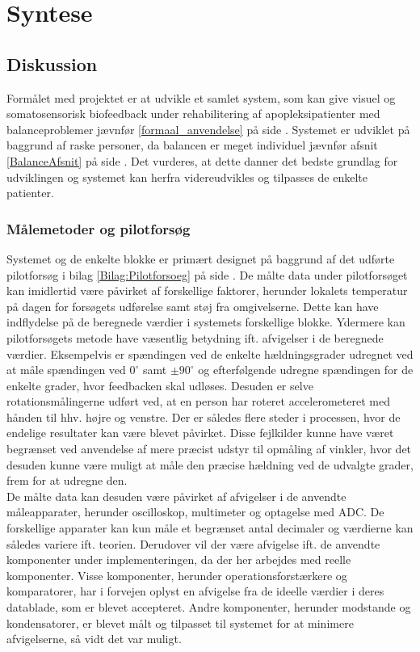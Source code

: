 \chapter{Syntese}
\section{Diskussion}
Formålet med projektet er at udvikle et samlet system, som kan give visuel og somatosensorisk biofeedback under rehabilitering af apopleksipatienter med balanceproblemer jævnfør \ref{formaal_anvendelse} på side \pageref{formaal_anvendelse}. Systemet er udviklet på baggrund af raske personer, da balancen er meget individuel jævnfør afsnit \ref{BalanceAfsnit} på side \pageref{BalanceAfsnit}. Det vurderes, at dette danner det bedste grundlag for udviklingen og systemet kan herfra videreudvikles og tilpasses de enkelte patienter. 

\subsection{Målemetoder og pilotforsøg}
Systemet og de enkelte blokke er primært designet på baggrund af det udførte pilotforsøg i bilag \ref{Bilag:Pilotforsoeg} på side \pageref{Bilag:Pilotforsoeg}. De målte data under pilotforsøget kan imidlertid være påvirket af forskellige faktorer, herunder lokalets temperatur på dagen for forsøgets udførelse samt støj fra omgivelserne. Dette kan have indflydelse på de beregnede værdier i systemets forskellige blokke.
Ydermere kan pilotforsøgets metode have væsentlig betydning ift. afvigelser i de beregnede værdier. Eksempelvis er spændingen ved de enkelte hældningsgrader udregnet ved at måle spændingen ved $0^{\circ}$ samt $\pm90^{\circ}$ og efterfølgende udregne spændingen for de enkelte grader, hvor feedbacken skal udløses. Desuden er selve rotationsmålingerne udført ved, at en person har roteret accelerometeret med hånden til hhv. højre og venstre. Der er således flere steder i processen, hvor de endelige resultater kan være blevet påvirket. Disse fejlkilder kunne have været begrænset ved anvendelse af mere præcist udstyr til opmåling af vinkler, hvor det desuden kunne være muligt at måle den præcise hældning ved de udvalgte grader, frem for at udregne den.  \\
De målte data kan desuden være påvirket af afvigelser i de anvendte måleapparater, herunder oscilloskop, multimeter og optagelse med ADC. De forskellige apparater kan kun måle et begrænset antal decimaler og værdierne kan således variere ift. teorien. Derudover vil der være afvigelse ift. de anvendte komponenter under implementeringen, da der her arbejdes med reelle komponenter. Visse komponenter, herunder operationsforstærkere og komparatorer, har i forvejen oplyst en afvigelse fra de ideelle værdier i deres datablade, som er blevet accepteret. Andre komponenter, herunder modstande og kondensatorer, er blevet målt og tilpasset til systemet for at minimere afvigelserne, så vidt det var muligt. 

